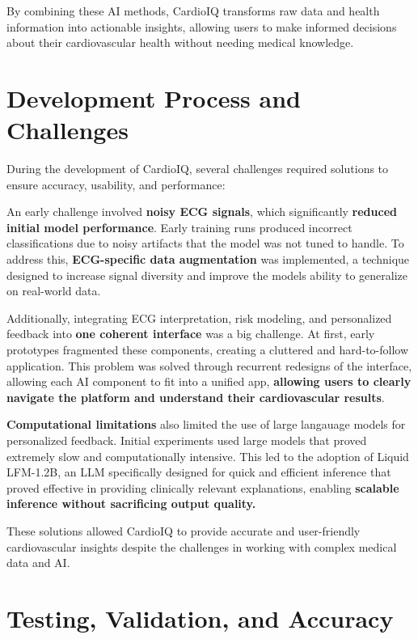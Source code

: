 \documentclass[12pt]{article}
\begin{document}
By combining these AI methods, CardioIQ transforms raw data and health information into actionable insights, allowing users to make informed decisions about their cardiovascular health without needing medical knowledge.

\section*{Development Process and Challenges}

During the development of CardioIQ, several challenges required solutions to ensure accuracy, usability, and performance:  

An early challenge involved \textbf{noisy ECG signals}, which significantly \textbf{reduced initial model performance}. Early training runs produced incorrect classifications due to noisy artifacts that the model was not tuned to handle. To address this, \textbf{ECG-specific data augmentation} was implemented, a technique designed to increase signal diversity and improve the models ability to generalize on real-world data. 

Additionally, integrating ECG interpretation, risk modeling, and personalized feedback into \textbf{one coherent interface} was a big challenge. At first, early prototypes fragmented these components, creating a cluttered and hard-to-follow application. This problem was solved through recurrent redesigns of the interface, allowing each AI component to fit into a unified app, \textbf{allowing users to clearly navigate the platform and understand their cardiovascular results}. 

\textbf{Computational limitations} also limited the use of large langauage models for personalized feedback. Initial experiments used large models that proved extremely slow and computationally intensive. This led to the adoption of Liquid LFM-1.2B, an LLM specifically designed for quick and efficient inference that proved effective in providing clinically relevant explanations, enabling \textbf{scalable inference without sacrificing output quality.} 

These solutions allowed CardioIQ to provide accurate and user-friendly cardiovascular insights despite the challenges in working with complex medical data and AI.

\section*{Testing, Validation, and Accuracy}
\end{document}
